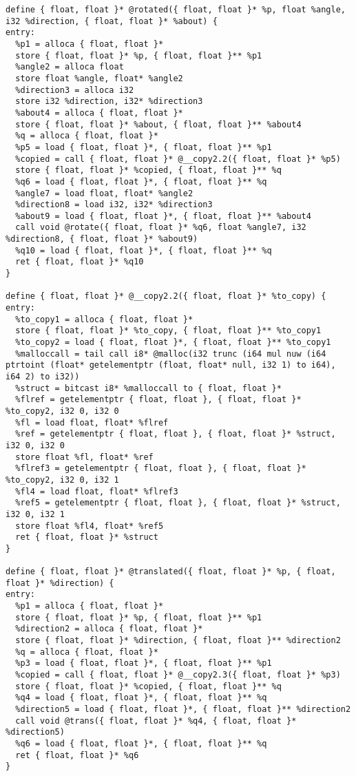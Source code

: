 \documentclass[main.tex]{subfiles}
\begin{document}
{\begin{lstlisting}
define { float, float }* @rotated({ float, float }* %p, float %angle, i32 %direction, { float, float }* %about) {
entry:
  %p1 = alloca { float, float }*
  store { float, float }* %p, { float, float }** %p1
  %angle2 = alloca float
  store float %angle, float* %angle2
  %direction3 = alloca i32
  store i32 %direction, i32* %direction3
  %about4 = alloca { float, float }*
  store { float, float }* %about, { float, float }** %about4
  %q = alloca { float, float }*
  %p5 = load { float, float }*, { float, float }** %p1
  %copied = call { float, float }* @__copy2.2({ float, float }* %p5)
  store { float, float }* %copied, { float, float }** %q
  %q6 = load { float, float }*, { float, float }** %q
  %angle7 = load float, float* %angle2
  %direction8 = load i32, i32* %direction3
  %about9 = load { float, float }*, { float, float }** %about4
  call void @rotate({ float, float }* %q6, float %angle7, i32 %direction8, { float, float }* %about9)
  %q10 = load { float, float }*, { float, float }** %q
  ret { float, float }* %q10
}

define { float, float }* @__copy2.2({ float, float }* %to_copy) {
entry:
  %to_copy1 = alloca { float, float }*
  store { float, float }* %to_copy, { float, float }** %to_copy1
  %to_copy2 = load { float, float }*, { float, float }** %to_copy1
  %malloccall = tail call i8* @malloc(i32 trunc (i64 mul nuw (i64 ptrtoint (float* getelementptr (float, float* null, i32 1) to i64), i64 2) to i32))
  %struct = bitcast i8* %malloccall to { float, float }*
  %flref = getelementptr { float, float }, { float, float }* %to_copy2, i32 0, i32 0
  %fl = load float, float* %flref
  %ref = getelementptr { float, float }, { float, float }* %struct, i32 0, i32 0
  store float %fl, float* %ref
  %flref3 = getelementptr { float, float }, { float, float }* %to_copy2, i32 0, i32 1
  %fl4 = load float, float* %flref3
  %ref5 = getelementptr { float, float }, { float, float }* %struct, i32 0, i32 1
  store float %fl4, float* %ref5
  ret { float, float }* %struct
}

define { float, float }* @translated({ float, float }* %p, { float, float }* %direction) {
entry:
  %p1 = alloca { float, float }*
  store { float, float }* %p, { float, float }** %p1
  %direction2 = alloca { float, float }*
  store { float, float }* %direction, { float, float }** %direction2
  %q = alloca { float, float }*
  %p3 = load { float, float }*, { float, float }** %p1
  %copied = call { float, float }* @__copy2.3({ float, float }* %p3)
  store { float, float }* %copied, { float, float }** %q
  %q4 = load { float, float }*, { float, float }** %q
  %direction5 = load { float, float }*, { float, float }** %direction2
  call void @trans({ float, float }* %q4, { float, float }* %direction5)
  %q6 = load { float, float }*, { float, float }** %q
  ret { float, float }* %q6
}


\end{lstlisting}}
\end{document}
